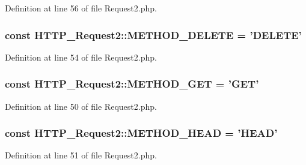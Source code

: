 Definition at line 56 of file Request2.\-php.

\hypertarget{classHTTP__Request2_ab6edf309179aa4535aa6a9b12b260978}{
\subsubsection[{M\-E\-T\-H\-O\-D\-\_\-\-D\-E\-L\-E\-T\-E}]{\setlength{\rightskip}{0pt plus 5cm}const H\-T\-T\-P\-\_\-\-Request2\-::\-M\-E\-T\-H\-O\-D\-\_\-\-D\-E\-L\-E\-T\-E = 'D\-E\-L\-E\-T\-E'}}\label{classHTTP__Request2_ab6edf309179aa4535aa6a9b12b260978}


Definition at line 54 of file Request2.\-php.

\hypertarget{classHTTP__Request2_a7c1f37cc2543c9d0fe5f09086bd50b3a}{
\subsubsection[{M\-E\-T\-H\-O\-D\-\_\-\-G\-E\-T}]{\setlength{\rightskip}{0pt plus 5cm}const H\-T\-T\-P\-\_\-\-Request2\-::\-M\-E\-T\-H\-O\-D\-\_\-\-G\-E\-T = 'G\-E\-T'}}\label{classHTTP__Request2_a7c1f37cc2543c9d0fe5f09086bd50b3a}


Definition at line 50 of file Request2.\-php.

\hypertarget{classHTTP__Request2_abb68a728946a9da5f19d5bb0cf676d58}{
\subsubsection[{M\-E\-T\-H\-O\-D\-\_\-\-H\-E\-A\-D}]{\setlength{\rightskip}{0pt plus 5cm}const H\-T\-T\-P\-\_\-\-Request2\-::\-M\-E\-T\-H\-O\-D\-\_\-\-H\-E\-A\-D = 'H\-E\-A\-D'}}\label{classHTTP__Request2_abb68a728946a9da5f19d5bb0cf676d58}


Definition at line 51 of file Request2.\-php.

